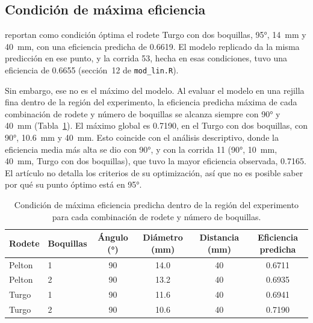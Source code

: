 \subsection{Condición de máxima eficiencia}

\citet{Lakdawala2025} reportan como condición óptima el rodete Turgo con dos boquillas, 95°, 14~mm y 40~mm, con una eficiencia predicha de 0.6619. El modelo replicado da la misma predicción en ese punto, y la corrida 53, hecha en esas condiciones, tuvo una eficiencia de 0.6655 (sección~12 de \texttt{mod\_lin.R}).

Sin embargo, ese no es el máximo del modelo. Al evaluar el modelo en una rejilla fina dentro de la región del experimento, la eficiencia predicha máxima de cada combinación de rodete y número de boquillas se alcanza siempre con 90° y 40~mm (Tabla~\ref{tab:maximos}). El máximo global es 0.7190, en el Turgo con dos boquillas, con 90°, 10.6~mm y 40~mm. Esto coincide con el análisis descriptivo, donde la eficiencia media más alta se dio con 90°, y con la corrida 11 (90°, 10~mm, 40~mm, Turgo con dos boquillas), que tuvo la mayor eficiencia observada, 0.7165. El artículo no detalla los criterios de su optimización, así que no es posible saber por qué su punto óptimo está en 95°.

\begin{table}[ht]
\centering
\caption{Condición de máxima eficiencia predicha dentro de la región del experimento para cada combinación de rodete y número de boquillas.}
\label{tab:maximos}
\begin{tabular}{llcccc}
\toprule
Rodete & Boquillas & Ángulo (°) & Diámetro (mm) & Distancia (mm) & Eficiencia predicha \\
\midrule
Pelton & 1 & 90 & 14.0 & 40 & 0.6711 \\
Pelton & 2 & 90 & 13.2 & 40 & 0.6935 \\
Turgo  & 1 & 90 & 11.6 & 40 & 0.6941 \\
Turgo  & 2 & 90 & 10.6 & 40 & 0.7190 \\
\bottomrule
\end{tabular}
\end{table}
